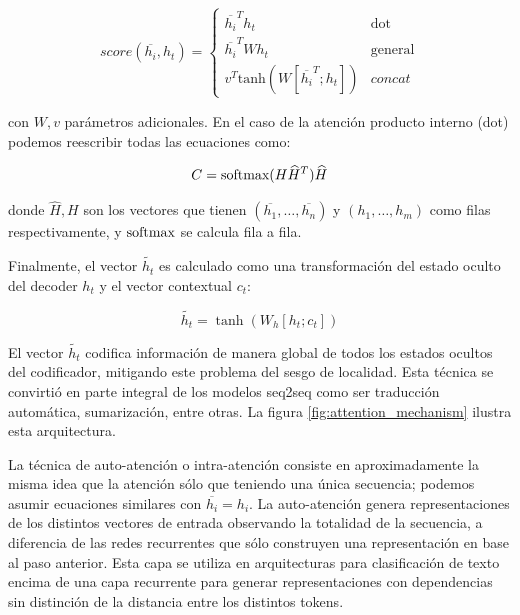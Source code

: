 \begin{equation}
    score(\overline{h_i}, h_t) =  \begin{cases}
        \overline{h_i}^T h_t   & \text{dot} \\
        \overline{h_i}^T W h_t & \text{general} \\
        v^T\text{tanh}(W [\overline{h_i}^T; h_t]) & concat
     \end{cases}
\end{equation}

%
\newcommand{\thicktilde}[1]{\mathbf{\tilde{\text{$#1$}}}}

con $W, v$ parámetros adicionales. En el caso de la atención producto interno (dot) podemos reescribir todas las ecuaciones como:

\begin{equation}
    C = \text{softmax}(H \widehat{H}^T ) \widehat{H}
    \label{eq:attention_product}
\end{equation}

donde $\widehat{H}, H$ son los vectores que tienen $(\overline{h_1}, \ldots , \overline{h_n})$  y $(h_1, \ldots , h_m)$ como filas respectivamente, y $\text{softmax}$ se calcula fila a fila.

Finalmente, el vector $\widetilde{h_t}$ es calculado como una transformación del estado oculto del decoder $h_t$ y el vector contextual $c_t$:


\begin{equation*}
    \widetilde{h_t} = \tanh(W_h [h_t; c_t])
\end{equation*}


El vector $\widetilde{h_t}$ codifica información de manera global de todos los estados ocultos del codificador, mitigando este problema del sesgo de localidad. Esta técnica se convirtió en parte integral de los modelos seq2seq como ser traducción automática, sumarización, entre otras. La figura \ref{fig:attention_mechanism} ilustra esta arquitectura.

La técnica de auto-atención o intra-atención \cite{parikh-etal-2016-decomposable} consiste en aproximadamente la misma idea que la atención sólo que teniendo una única secuencia; podemos asumir ecuaciones similares con $\overline{h_i} = h_i$. La auto-atención genera representaciones de los distintos vectores de entrada observando la totalidad de la secuencia, a diferencia de las redes recurrentes que sólo construyen una representación en base al paso anterior. Esta capa se utiliza en arquitecturas para clasificación de texto encima de una capa recurrente para generar representaciones con dependencias sin distinción de la distancia entre los distintos tokens.

